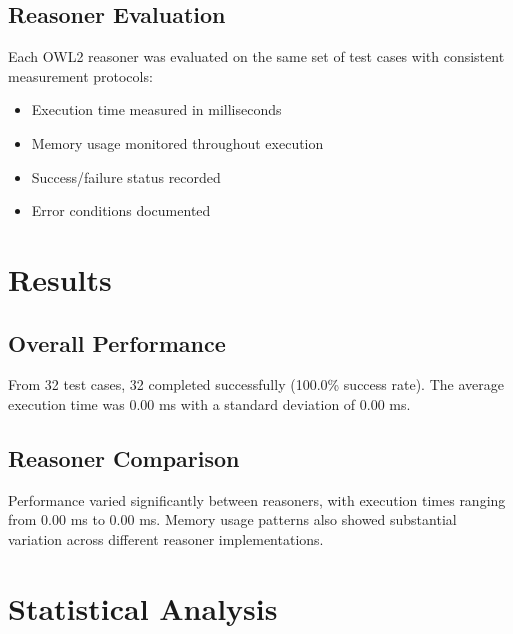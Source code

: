 \documentclass[11pt,a4paper]{{article}}
\begin{document}
\subsection{Reasoner Evaluation}
Each OWL2 reasoner was evaluated on the same set of test cases with consistent measurement protocols:
\begin{itemize}
    \item Execution time measured in milliseconds
    \item Memory usage monitored throughout execution
    \item Success/failure status recorded
    \item Error conditions documented
\end{itemize}


\section{Results}

\subsection{Overall Performance}
From 32 test cases, 32 completed successfully (100.0\% success rate). The average execution time was 0.00 ms with a standard deviation of 0.00 ms.

\subsection{Reasoner Comparison}
Performance varied significantly between reasoners, with execution times ranging from 0.00 ms to 0.00 ms. Memory usage patterns also showed substantial variation across different reasoner implementations.


\section{Statistical Analysis}
\end{document}

